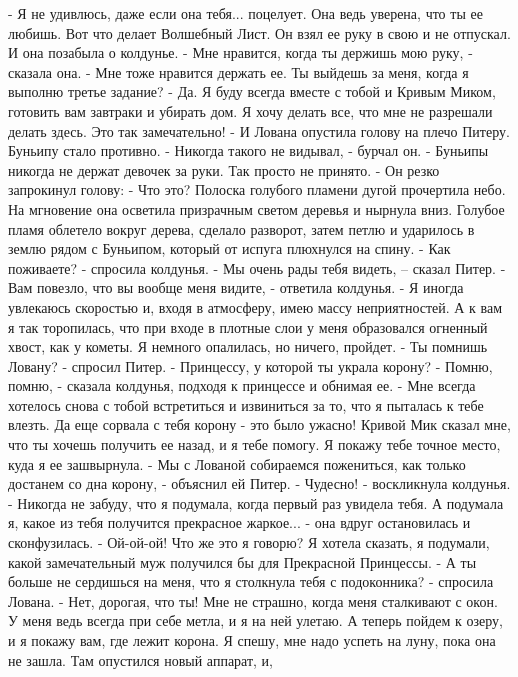    - Я не удивлюсь, даже если она тебя... поцелует. Она ведь уверена, 
что ты ее любишь. Вот что делает Волшебный Лист.
    Он взял ее руку в свою и не отпускал. И она позабыла о колдунье.
    - Мне нравится, когда ты держишь мою руку, - сказала она.
    - Мне тоже нравится держать ее. Ты выйдешь за меня, когда я 
выполню третье задание?
    - Да. Я буду всегда вместе с тобой и Кривым Миком, готовить вам 
завтраки и убирать дом. Я хочу делать все, что мне не разрешали делать 
здесь. Это так замечательно! - И Лована опустила голову на плечо 
Питеру.
    Буньипу стало противно.
    - Никогда такого не видывал, - бурчал он. - Буньипы никогда не 
держат девочек за руки. Так просто не принято. - Он резко запрокинул 
голову: - Что это?
    Полоска голубого пламени дугой прочертила небо. На мгновение она 
осветила призрачным светом деревья и нырнула вниз. Голубое пламя 
облетело вокруг дерева, сделало разворот, затем петлю и ударилось в 
землю рядом с Буньипом, который от испуга плюхнулся на спину.
    - Как поживаете? - спросила колдунья.
    - Мы очень рады тебя видеть, -- сказал Питер.
    - Вам повезло, что вы вообще меня видите, - ответила колдунья. - Я 
иногда увлекаюсь скоростью и, входя в атмосферу, имею массу 
неприятностей. А к вам я так торопилась, что при входе в плотные слои 
у меня образовался огненный хвост, как у кометы. Я немного опалилась, 
но ничего, пройдет.
    - Ты помнишь Ловану? - спросил Питер. - Принцессу, у которой ты 
украла корону?
    - Помню, помню, - сказала колдунья, подходя к принцессе и обнимая 
ее. - Мне всегда хотелось снова с тобой встретиться и извиниться за 
то, что я пыталась к тебе влезть. Да еще сорвала с тебя корону - это 
было ужасно! Кривой Мик сказал мне, что ты хочешь получить ее назад, и 
я тебе помогу. Я покажу тебе точное место, куда я ее зашвырнула.
    - Мы с Лованой собираемся пожениться, как только достанем со дна 
корону, - объяснил ей Питер.
    - Чудесно! - воскликнула колдунья. - Никогда не забуду, что я 
подумала, когда первый раз увидела тебя. А подумала я, какое из тебя 
получится прекрасное жаркое... - она вдруг остановилась и 
сконфузилась. - Ой-ой-ой! Что же это я говорю? Я хотела сказать, я 
подумали, какой замечательный муж получился бы для Прекрасной 
Принцессы.
    - А ты больше не сердишься на меня, что я столкнула тебя с 
подоконника? - спросила Лована.
    - Нет, дорогая, что ты! Мне не страшно, когда меня сталкивают с 
окон. У меня ведь всегда при себе метла, и я на ней улетаю. А теперь 
пойдем к озеру, и я покажу вам, где лежит корона. Я спешу, мне надо 
успеть на луну, пока она не зашла. Там опустился новый аппарат, и, 

